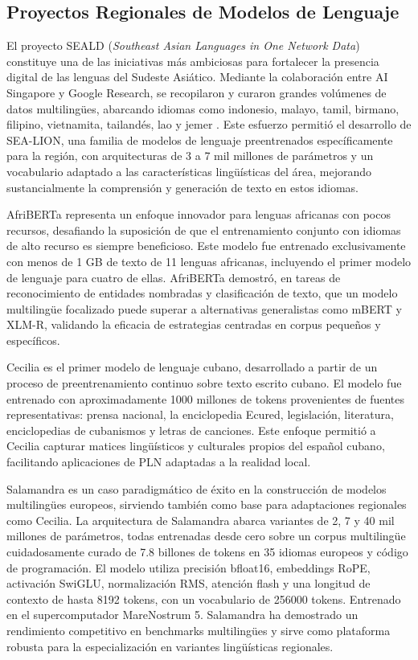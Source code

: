 \documentclass[10pt,twoside]{rcmart} %
\begin{document}
\subsection{Proyectos Regionales de Modelos de Lenguaje}

El proyecto SEALD (\textit{Southeast Asian Languages in One Network Data}) constituye una de las iniciativas más ambiciosas para fortalecer la presencia digital de las lenguas del Sudeste Asiático. Mediante la colaboración entre AI Singapore y Google Research, se recopilaron y curaron grandes volúmenes de datos multilingües, abarcando idiomas como indonesio, malayo, tamil, birmano, filipino, vietnamita, tailandés, lao y jemer \cite{ng2025sea}. Este esfuerzo permitió el desarrollo de SEA-LION, una familia de modelos de lenguaje preentrenados específicamente para la región, con arquitecturas de 3 a 7 mil millones de parámetros y un vocabulario adaptado a las características lingüísticas del área, mejorando sustancialmente la comprensión y generación de texto en estos idiomas.

AfriBERTa \cite{ogueji2021small} representa un enfoque innovador para lenguas africanas con pocos recursos, desafiando la suposición de que el entrenamiento conjunto con idiomas de alto recurso es siempre beneficioso. Este modelo fue entrenado exclusivamente con menos de 1 GB de texto de 11 lenguas africanas, incluyendo el primer modelo de lenguaje para cuatro de ellas. AfriBERTa demostró, en tareas de reconocimiento de entidades nombradas y clasificación de texto, que un modelo multilingüe focalizado puede superar a alternativas generalistas como mBERT y XLM-R, validando la eficacia de estrategias centradas en corpus pequeños y específicos.

Cecilia es el primer modelo de lenguaje cubano, desarrollado a partir de un proceso de preentrenamiento continuo sobre texto escrito cubano. El modelo fue entrenado con aproximadamente 1000 millones de tokens provenientes de fuentes representativas: prensa nacional, la enciclopedia Ecured, legislación, literatura, enciclopedias de cubanismos y letras de canciones. Este enfoque permitió a Cecilia capturar matices lingüísticos y culturales propios del español cubano, facilitando aplicaciones de PLN adaptadas a la realidad local.

Salamandra \cite{gonzalez2025salamandra} es un caso paradigmático de éxito en la construcción de modelos multilingües europeos, sirviendo también como base para adaptaciones regionales como Cecilia. La arquitectura de Salamandra abarca variantes de 2, 7 y 40 mil millones de parámetros, todas entrenadas desde cero sobre un corpus multilingüe cuidadosamente curado de 7.8 billones de tokens en 35 idiomas europeos y código de programación. El modelo utiliza precisión bfloat16, embeddings RoPE, activación SwiGLU, normalización RMS, atención flash y una longitud de contexto de hasta 8192 tokens, con un vocabulario de 256000 tokens. Entrenado en el supercomputador MareNostrum 5. Salamandra ha demostrado un rendimiento competitivo en benchmarks multilingües y sirve como plataforma robusta para la especialización en variantes lingüísticas regionales.
\end{document}
